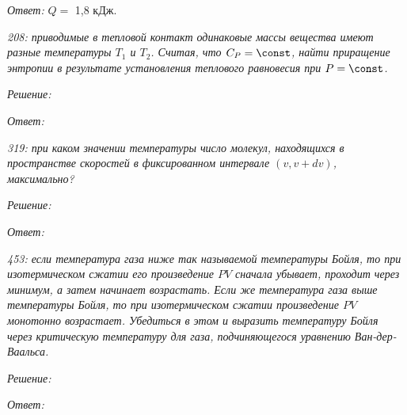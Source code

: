 \documentclass[pscyr]{hedsemwork}
\begin{document}
\vspace*{2em}
\emph{Ответ:} \( Q = \) 1,8 кДж.

\newpage %

\emph{208: приводимые в тепловой контакт одинаковые массы вещества имеют разные
температуры \( T_1 \) и \( T_2 \). Считая, что \( C_P = \const \), найти
приращение энтропии в результате установления теплового равновесия при
\( P = \const \).}

\vspace*{2em}
\emph{Решение:}

\vspace*{2em}
\emph{Ответ:}

\newpage %

\emph{319: при каком значении температуры число молекул, находящихся в
пространстве скоростей в фиксированном интервале \( (v, v + dv) \), максимально?}

\vspace*{2em}
\emph{Решение:}

\vspace*{2em}
\emph{Ответ:}

\newpage %

\emph{453: если температура газа ниже так называемой температуры Бойля, то при
изотермическом сжатии его произведение \( PV \) сначала убывает, проходит через
минимум, а затем начинает возрастать. Если же температура газа выше температуры
Бойля, то при изотермическом сжатии произведение \( PV \) монотонно возрастает.
Убедиться в этом и выразить температуру Бойля через критическую температуру для
газа, подчиняющегося уравнению Ван-дер-Ваальса.}

\vspace*{2em}
\emph{Решение:}

\vspace*{2em}
\emph{Ответ:}
\end{document}
